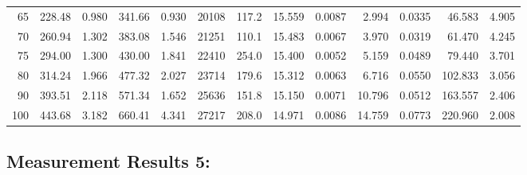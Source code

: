 \documentclass[10pt]{article}
\begin{document}
{\begin{tabular}{|r|rr|rr|rr|rr|rr|r|r|}
       65 &       228.48 &        0.980 &       341.66 &        0.930 &        20108 &        117.2 &       15.559 &       0.0087 &        2.994 &       0.0335 &       46.583 &        4.905 \\
       70 &       260.94 &        1.302 &       383.08 &        1.546 &        21251 &        110.1 &       15.483 &       0.0067 &        3.970 &       0.0319 &       61.470 &        4.245 \\
       75 &       294.00 &        1.300 &       430.00 &        1.841 &        22410 &        254.0 &       15.400 &       0.0052 &        5.159 &       0.0489 &       79.440 &        3.701 \\
       80 &       314.24 &        1.966 &       477.32 &        2.027 &        23714 &        179.6 &       15.312 &       0.0063 &        6.716 &       0.0550 &      102.833 &        3.056 \\
       90 &       393.51 &        2.118 &       571.34 &        1.652 &        25636 &        151.8 &       15.150 &       0.0071 &       10.796 &       0.0512 &      163.557 &        2.406 \\
      100 &       443.68 &        3.182 &       660.41 &        4.341 &        27217 &        208.0 &       14.971 &       0.0086 &       14.759 &       0.0773 &      220.960 &        2.008 \\
\hline
\end{tabular}
}



\subsection*{\large \bf Measurement Results 5:}
\end{document}
